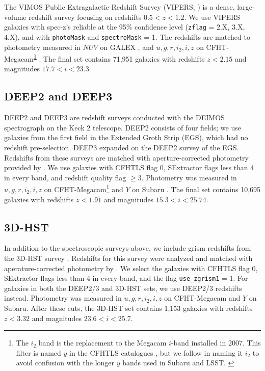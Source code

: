 The VIMOS Public Extragalactic Redshift Survey (VIPERS, \citealt{Scodeggio2018a}) is a dense, large-volume redshift survey focusing on redshifts $0.5 < z < 1.2$.
We use VIPERS galaxies with spec-z's reliable at the 95\% confidence level (\texttt{zflag} = 2.X, 3.X, 4.X), and with \texttt{photoMask} and \texttt{spectroMask} = 1.
The redshifts are matched to photometry measured in $NUV$ on GALEX \citep{Martin2005a}, and $u,g,r,i_2,i,z$ on CFHT-Megacam\textsuperscript{\ref{ft:i2}} \citep{Hudelot2012}. 
The final set contains 71,951 galaxies with redshifts $z < 2.15$ and magnitudes $17.7 < i < 23.3$. 

\subsection{DEEP2 and DEEP3}

DEEP2 and DEEP3 are redshift surveys conducted with the DEIMOS spectrograph on the Keck 2 telescope.
DEEP2 \citep{Newman2013b} consists of four fields; we use galaxies from the first field in the Extended Groth Strip (EGS), which had no redshift pre-selection.
DEEP3 \citep{Cooper2011} expanded on the DEEP2 survey of the EGS.
Redshifts from these surveys are matched with aperture-corrected photometry provided by \citet{Zhou2019a}.
We use galaxies with CFHTLS flag 0, SExtractor flags less than 4 in every band, and redshift quality flag $\geq 3$.
Photometry was measured in $u,g,r,i_2,i,z$ on CFHT-Megacam\footnote{The $i_2$ band is the replacement to the Megacam $i$-band installed in 2007. This filter is named $y$ in the CFHTLS catalogues \citep{Hudelot2012}, but we follow \citet{Zhou2019a} in naming it $i_2$ to avoid confusion with the longer $y$ bands used in Subaru and LSST. \label{ft:i2}} and $Y$ on Subaru \citep{Miyazaki2002}.
The final set contains 10,695 galaxies with redshifts $z < 1.91$ and magnitudes $15.3 < i < 25.74$.


\subsection{3D-HST}

In addition to the spectroscopic surveys above, we include grism redshifts from the 3D-HST survey \citep{Newman2013b,Momcheva2016b}.
Redshifts for this survey were analyzed and matched with aperature-corrected photometry by \citet{Zhou2019a}.
We select the galaxies with CFHTLS flag 0, SExtractor flags less than 4 in every band, and the flag \texttt{use\_zgrism1} = 1.
For galaxies in both the DEEP2/3 and 3D-HST sets, we use DEEP2/3 redshifts instead.
Photometry was measured in $u,g,r,i_2,i,z$ on CFHT-Megacam and $Y$ on Subaru.
After these cuts, the 3D-HST set contains 1,153 galaxies with redshifts $z < 3.32$ and magnitudes $23.6 < i < 25.7$.

